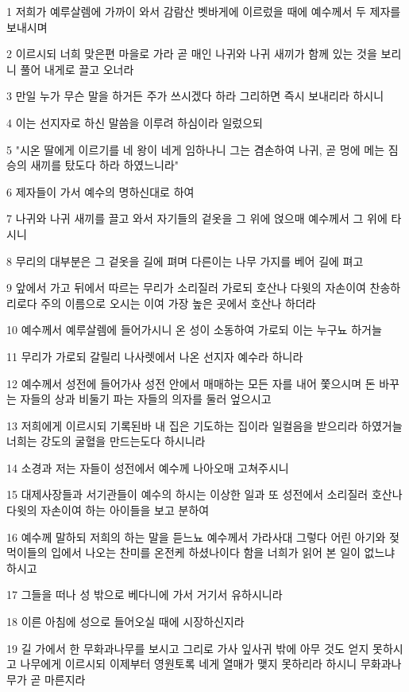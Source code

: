 \par 1 저희가 예루살렘에 가까이 와서 감람산 벳바게에 이르렀을 때에 예수께서 두 제자를 보내시며
\par 2 이르시되 너희 맞은편 마을로 가라 곧 매인 나귀와 나귀 새끼가 함께 있는 것을 보리니 풀어 내게로 끌고 오너라
\par 3 만일 누가 무슨 말을 하거든 주가 쓰시겠다 하라 그리하면 즉시 보내리라 하시니
\par 4 이는 선지자로 하신 말씀을 이루려 하심이라 일렀으되
\par 5 "시온 딸에게 이르기를 네 왕이 네게 임하나니 그는 겸손하여 나귀, 곧 멍에 메는 짐승의 새끼를 탔도다 하라 하였느니라"
\par 6 제자들이 가서 예수의 명하신대로 하여
\par 7 나귀와 나귀 새끼를 끌고 와서 자기들의 겉옷을 그 위에 얹으매 예수께서 그 위에 타시니
\par 8 무리의 대부분은 그 겉옷을 길에 펴며 다른이는 나무 가지를 베어 길에 펴고
\par 9 앞에서 가고 뒤에서 따르는 무리가 소리질러 가로되 호산나 다윗의 자손이여 찬송하리로다 주의 이름으로 오시는 이여 가장 높은 곳에서 호산나 하더라
\par 10 예수께서 예루살렘에 들어가시니 온 성이 소동하여 가로되 이는 누구뇨 하거늘
\par 11 무리가 가로되 갈릴리 나사렛에서 나온 선지자 예수라 하니라
\par 12 예수께서 성전에 들어가사 성전 안에서 매매하는 모든 자를 내어 쫓으시며 돈 바꾸는 자들의 상과 비둘기 파는 자들의 의자를 둘러 엎으시고
\par 13 저희에게 이르시되 기록된바 내 집은 기도하는 집이라 일컬음을 받으리라 하였거늘 너희는 강도의 굴혈을 만드는도다 하시니라
\par 14 소경과 저는 자들이 성전에서 예수께 나아오매 고쳐주시니
\par 15 대제사장들과 서기관들이 예수의 하시는 이상한 일과 또 성전에서 소리질러 호산나 다윗의 자손이여 하는 아이들을 보고 분하여
\par 16 예수께 말하되 저희의 하는 말을 듣느뇨 예수께서 가라사대 그렇다 어린 아기와 젖먹이들의 입에서 나오는 찬미를 온전케 하셨나이다 함을 너희가 읽어 본 일이 없느냐 하시고
\par 17 그들을 떠나 성 밖으로 베다니에 가서 거기서 유하시니라
\par 18 이른 아침에 성으로 들어오실 때에 시장하신지라
\par 19 길 가에서 한 무화과나무를 보시고 그리로 가사 잎사귀 밖에 아무 것도 얻지 못하시고 나무에게 이르시되 이제부터 영원토록 네게 열매가 맺지 못하리라 하시니 무화과나무가 곧 마른지라
